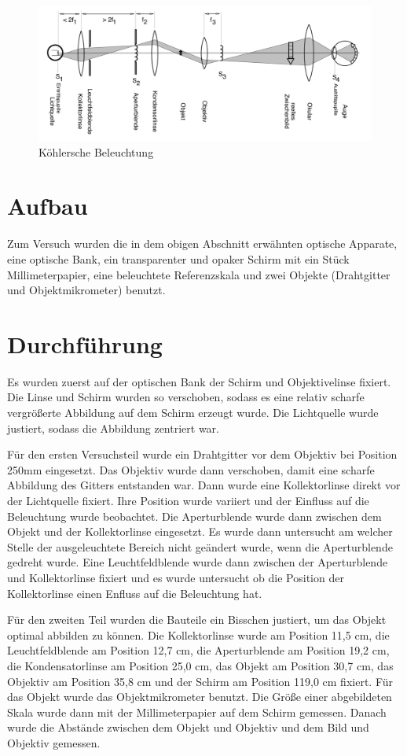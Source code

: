 \documentclass[11pt,a4paper]{article}
\begin{document}
\begin{figure}
	\centering
	\includegraphics[width=\linewidth]{Abb3}
	\caption{Köhlersche Beleuchtung}
\end{figure}

\section{Aufbau}
Zum Versuch wurden die in dem obigen Abschnitt erwähnten optische Apparate, eine optische Bank, ein transparenter und opaker Schirm mit ein Stück Millimeterpapier, eine beleuchtete Referenzskala und zwei Objekte (Drahtgitter und Objektmikrometer) benutzt. 

\section{Durchführung}
Es wurden zuerst auf der optischen Bank der Schirm und Objektivelinse fixiert. Die Linse und Schirm wurden so verschoben, sodass es eine relativ scharfe vergrößerte Abbildung auf dem Schirm erzeugt wurde. Die Lichtquelle wurde justiert, sodass die Abbildung zentriert war.  

Für den ersten Versuchsteil wurde ein Drahtgitter vor dem Objektiv bei Position 250mm eingesetzt. Das Objektiv wurde dann verschoben, damit eine scharfe Abbildung des Gitters entstanden war. Dann wurde eine Kollektorlinse direkt vor der Lichtquelle fixiert. Ihre Position wurde variiert und der Einfluss auf die Beleuchtung wurde beobachtet. Die Aperturblende wurde dann zwischen dem Objekt und der Kollektorlinse eingesetzt. Es wurde dann untersucht am welcher Stelle der ausgeleuchtete Bereich nicht geändert wurde, wenn die Aperturblende gedreht wurde. Eine Leuchtfeldblende wurde dann zwischen der Aperturblende und Kollektorlinse fixiert und es wurde untersucht ob die Position der Kollektorlinse einen Enfluss auf die Beleuchtung hat. 

Für den zweiten Teil wurden die Bauteile ein Bisschen justiert, um das Objekt optimal abbilden zu können. Die Kollektorlinse wurde am Position 11,5 cm, die Leuchtfeldblende am Position 12,7 cm, die Aperturblende am Position 19,2 cm, die Kondensatorlinse am Position 25,0 cm, das Objekt am Position 30,7 cm, das Objektiv am Position 35,8 cm und der Schirm am Position 119,0 cm fixiert. Für das Objekt wurde das Objektmikrometer benutzt. Die Größe einer abgebildeten Skala wurde dann mit der Millimeterpapier auf dem Schirm gemessen. Danach wurde die Abstände zwischen dem Objekt und Objektiv und dem Bild und Objektiv gemessen. 
\end{document}
